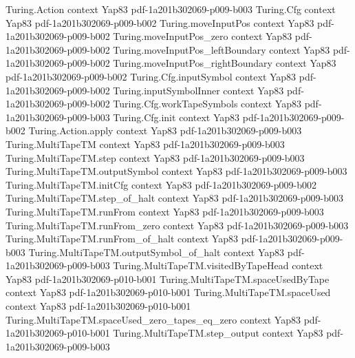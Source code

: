 \begin{theorem}
\label{Complexity.altQuant_false_succ}
\leanok
\proofstep
  {Turing.Action}
  {context}
  {Yap83}
  {pdf-1a201b302069-p009-b003}
\proofstep
  {Turing.Cfg}
  {context}
  {Yap83}
  {pdf-1a201b302069-p009-b002}
\proofstep
  {Turing.moveInputPos}
  {context}
  {Yap83}
  {pdf-1a201b302069-p009-b002}
\proofstep
  {Turing.moveInputPos_zero}
  {context}
  {Yap83}
  {pdf-1a201b302069-p009-b002}
\proofstep
  {Turing.moveInputPos_leftBoundary}
  {context}
  {Yap83}
  {pdf-1a201b302069-p009-b002}
\proofstep
  {Turing.moveInputPos_rightBoundary}
  {context}
  {Yap83}
  {pdf-1a201b302069-p009-b002}
\proofstep
  {Turing.Cfg.inputSymbol}
  {context}
  {Yap83}
  {pdf-1a201b302069-p009-b002}
\proofstep
  {Turing.inputSymbolInner}
  {context}
  {Yap83}
  {pdf-1a201b302069-p009-b002}
\proofstep
  {Turing.Cfg.workTapeSymbols}
  {context}
  {Yap83}
  {pdf-1a201b302069-p009-b003}
\proofstep
  {Turing.Cfg.init}
  {context}
  {Yap83}
  {pdf-1a201b302069-p009-b002}
\proofstep
  {Turing.Action.apply}
  {context}
  {Yap83}
  {pdf-1a201b302069-p009-b003}
\proofstep
  {Turing.MultiTapeTM}
  {context}
  {Yap83}
  {pdf-1a201b302069-p009-b003}
\proofstep
  {Turing.MultiTapeTM.step}
  {context}
  {Yap83}
  {pdf-1a201b302069-p009-b003}
\proofstep
  {Turing.MultiTapeTM.outputSymbol}
  {context}
  {Yap83}
  {pdf-1a201b302069-p009-b003}
\proofstep
  {Turing.MultiTapeTM.initCfg}
  {context}
  {Yap83}
  {pdf-1a201b302069-p009-b002}
\proofstep
  {Turing.MultiTapeTM.step_of_halt}
  {context}
  {Yap83}
  {pdf-1a201b302069-p009-b003}
\proofstep
  {Turing.MultiTapeTM.runFrom}
  {context}
  {Yap83}
  {pdf-1a201b302069-p009-b003}
\proofstep
  {Turing.MultiTapeTM.runFrom_zero}
  {context}
  {Yap83}
  {pdf-1a201b302069-p009-b003}
\proofstep
  {Turing.MultiTapeTM.runFrom_of_halt}
  {context}
  {Yap83}
  {pdf-1a201b302069-p009-b003}
\proofstep
  {Turing.MultiTapeTM.outputSymbol_of_halt}
  {context}
  {Yap83}
  {pdf-1a201b302069-p009-b003}
\proofstep
  {Turing.MultiTapeTM.visitedByTapeHead}
  {context}
  {Yap83}
  {pdf-1a201b302069-p010-b001}
\proofstep
  {Turing.MultiTapeTM.spaceUsedByTape}
  {context}
  {Yap83}
  {pdf-1a201b302069-p010-b001}
\proofstep
  {Turing.MultiTapeTM.spaceUsed}
  {context}
  {Yap83}
  {pdf-1a201b302069-p010-b001}
\proofstep
  {Turing.MultiTapeTM.spaceUsed_zero_tapes_eq_zero}
  {context}
  {Yap83}
  {pdf-1a201b302069-p010-b001}
\proofstep
  {Turing.MultiTapeTM.step_output}
  {context}
  {Yap83}
  {pdf-1a201b302069-p009-b003}

\end{theorem}
